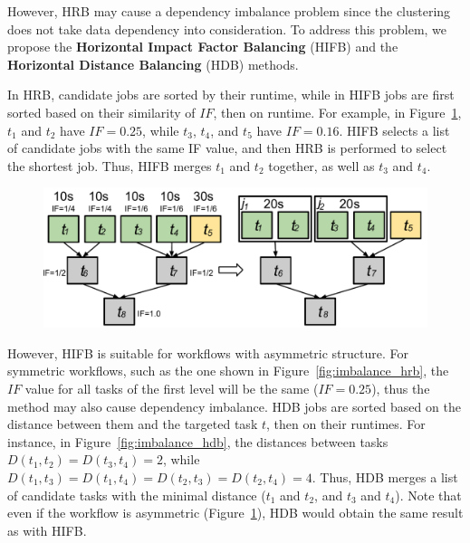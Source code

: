 However, HRB may cause a dependency imbalance problem since the clustering does not take data dependency into consideration. To address this problem, we propose the \textbf{Horizontal Impact Factor Balancing} (HIFB) and the \textbf{Horizontal Distance Balancing} (HDB) methods. 

In HRB, candidate jobs are sorted by their runtime, while in HIFB jobs are first sorted based on their similarity of $IF$, then on runtime. For example, in Figure~\ref{fig:imbalance_hifb}, $t_1$ and $t_2$ have $IF = 0.25$, while $t_3$, $t_4$, and $t_5$ have $IF = 0.16$. HIFB selects a list of candidate jobs with the same IF value, and then HRB is performed to select the shortest job. Thus, HIFB merges $t_1$ and $t_2$ together, as well as $t_3$ and $t_4$.

\begin{figure}[htb]
	\centering
	\includegraphics[width=\linewidth]{figures/imbalance/hifb.pdf}
	\label{fig:imbalance_hifb}
\end{figure}

However, HIFB is suitable for workflows with asymmetric structure. For symmetric workflows, such as the one shown in Figure~\ref{fig:imbalance_hrb}, the $IF$ value for all tasks of the first level will be the same ($IF=0.25$), thus the method may also cause dependency imbalance. HDB jobs are sorted based on the distance between them and the targeted task $t$, then on their runtimes. For instance, in Figure~\ref{fig:imbalance_hdb}, the distances between tasks $D(t_1,t_2)=D(t_3,t_4)=2$, while $D(t_1,t_3)=D(t_1,t_4)=D(t_2,t_3)=D(t_2,t_4)=4$. Thus, HDB merges a list of candidate tasks with the minimal distance ($t_1$ and $t_2$, and $t_3$ and $t_4$). Note that even if the workflow is asymmetric (Figure~\ref{fig:imbalance_hifb}), HDB would obtain the same result as with HIFB. 

